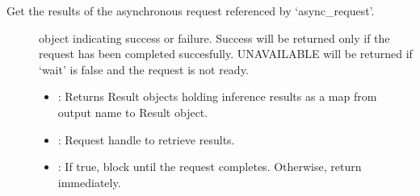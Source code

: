 \documentclass[letterpaper,10pt,english]{sphinxmanual}
\begin{document}
\begin{fulllineitems}
\begin{fulllineitems}
\label{\detokenize{cpp_api/classnvidia_1_1inferenceserver_1_1client_1_1InferHttpContext:_CPPv4N6nvidia15inferenceserver6client16InferHttpContext18GetAsyncRunResultsEP9ResultMapRKNSt10shared_ptrI7RequestEEb}}%
\pysigstartmultiline
{}\label{\detokenize{cpp_api/classnvidia_1_1inferenceserver_1_1client_1_1InferHttpContext:classnvidia_1_1inferenceserver_1_1client_1_1InferHttpContext_1a646ec6ca28f8c38a23b4e85c3ad8e8ec}}%
\pysigstopmultiline
Get the results of the asynchronous request referenced by ‘async\_request’. 

\begin{description}
\item[{}] \leavevmode
{\hyperref[\detokenize{cpp_api/classnvidia_1_1inferenceserver_1_1client_1_1Error:classnvidia_1_1inferenceserver_1_1client_1_1Error}]{}} object indicating success or failure. Success will be returned only if the request has been completed succesfully. UNAVAILABLE will be returned if ‘wait’ is false and the request is not ready. 

\item[{}] \leavevmode\begin{itemize}
\item {} 
: Returns Result objects holding inference results as a map from output name to Result object. 

\item {} 
: Request handle to retrieve results. 

\item {} 
: If true, block until the request completes. Otherwise, return immediately. 

\end{itemize}

\end{description}


\end{fulllineitems}


\end{fulllineitems}
\end{document}
